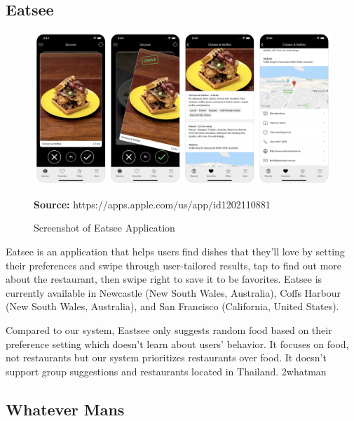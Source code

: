 \documentclass[12pt,oneside,openright,a4paper]{cpe-english-project}
\newcommand*{\captionsource}[2]{%
  \caption[{#1}]{#1}\vspace{-8pt}
  \textbf{Source:} #2}
\begin{document}
\newpage
\subsection{Eatsee}

\begin{figure}[H]\centering
\includegraphics[width=400pt]{./images/2eatseereal.png}
\label{fig:2eatseereal}
\captionsource{Screenshot of Eatsee Application}{https://apps.apple.com/us/app/id1202110881}
\end{figure}\vspace{-24pt}
\vspace{1em}

Eatsee is an application that helps users find dishes that they’ll love by setting their preferences and swipe through user-tailored results, tap to find out more about the restaurant, then swipe right to save it to be favorites. Eatsee is currently available in Newcastle (New South Wales, Australia), Coffs Harbour (New South Wales, Australia), and San Francisco (California, United States). \cite{EatseeSeeitEatit}

Compared to our system, Eastsee only suggests random food based on their preference setting which doesn’t learn about users’ behavior. It focuses on food, not restaurants but our system prioritizes restaurants over food. It doesn’t support group suggestions and restaurants located in Thailand.
2whatman

\newpage
\subsection{Whatever Mans}
\end{document}
